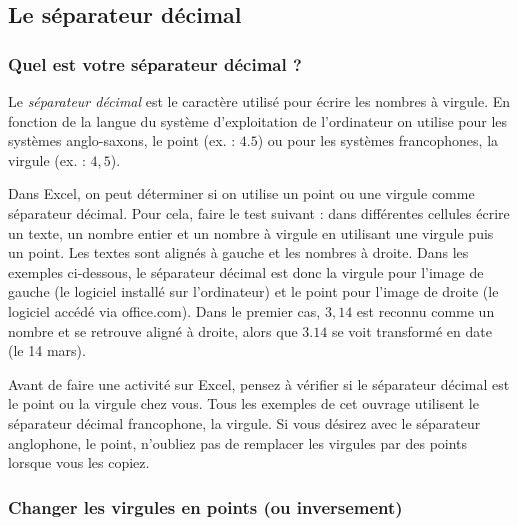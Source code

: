 \subsection{Le séparateur décimal}\label{Calc3sepDec}

\subsubsection{Quel est votre séparateur décimal ?}


Le \emph{séparateur décimal} est le caractère utilisé pour écrire les nombres à virgule. En fonction de la langue du système d'exploitation de l'ordinateur on utilise pour les systèmes anglo-saxons, le point (ex. : $4.5$) ou pour les systèmes francophones, la virgule (ex. : $4,5$).

\vspace{6pt}

Dans Excel, on peut déterminer si on utilise un point ou une virgule comme séparateur décimal. Pour cela, faire le test suivant : dans différentes cellules écrire un texte, un nombre entier et un nombre à virgule en utilisant une virgule puis un point. Les textes sont alignés à gauche et les nombres à droite. Dans les exemples ci-dessous, le séparateur décimal est donc la virgule pour l'image de gauche (le logiciel installé sur l'ordinateur) et le point pour l'image de droite (le logiciel accédé via office.com). Dans le premier cas, $3,14$ est reconnu comme un nombre et se retrouve aligné à droite, alors que $3.14$ se voit transformé en date (le 14 mars).


Avant de faire une activité sur Excel, pensez à vérifier si le séparateur décimal est le point ou la virgule chez vous. Tous les exemples de cet ouvrage utilisent le séparateur décimal francophone, la virgule. Si vous désirez avec le séparateur anglophone, le point, n'oubliez pas de remplacer les virgules par des points lorsque vous les copiez.

\subsubsection{Changer les virgules en points (ou inversement)}

